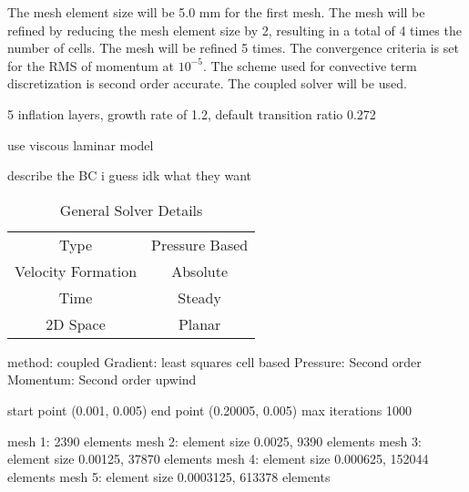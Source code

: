 The mesh element size will be 5.0 mm for the first mesh. The mesh will be refined by reducing the mesh element size by 2, resulting in a total of 4 times the number of cells. The mesh will be refined 5 times. The convergence criteria is set for the RMS of momentum at $10^{-5}$. The scheme used for convective term discretization is second order accurate. The coupled solver will be used.

5 inflation layers, growth rate of 1.2, default transition ratio 0.272

use viscous laminar model 

describe the BC i guess idk what they want

\begin{table}[h]
    \centering
    \caption{General Solver Details}
    \begin{tabular}{cc}
        \toprule
        Type & Pressure Based \\
        Velocity Formation & Absolute \\
        Time & Steady \\
        2D Space & Planar \\
        \bottomrule
    \end{tabular}
\end{table}
    method: coupled
    Gradient: least squares cell based
    Pressure: Second order
    Momentum: Second order upwind

    start point (0.001, 0.005)
    end point (0.20005, 0.005)
    max iterations 1000

    mesh 1: 2390 elements
    mesh 2: element size 0.0025, 9390 elements
    mesh 3: element size 0.00125, 37870 elements
    mesh 4: element size 0.000625, 152044 elements
    mesh 5: element size 0.0003125, 613378 elements